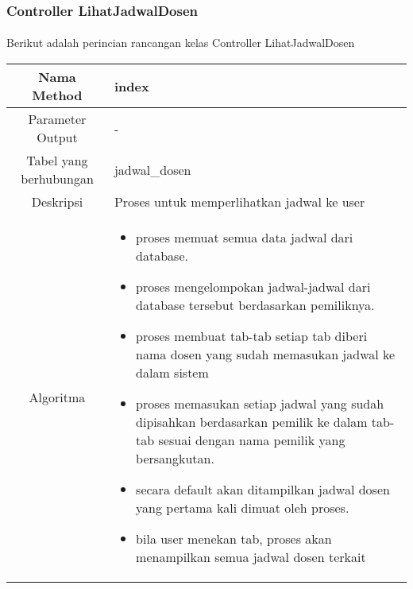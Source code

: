 \subsubsection{Controller LihatJadwalDosen}
\paragraph{} Berikut adalah perincian rancangan kelas Controller LihatJadwalDosen \\
\begin{tabular}{|c|p{11cm}|}
\hline
Nama Method 	& 	index 	\\
\hline
Parameter Output & - \\
\hline
Tabel yang berhubungan & jadwal\_dosen \\
\hline
Deskripsi	& Proses untuk memperlihatkan jadwal ke user \\
\hline
Algoritma	& \begin{itemize}
				\item proses memuat semua data jadwal dari database.
				\item proses mengelompokan jadwal-jadwal dari database tersebut berdasarkan pemiliknya.
				\item proses membuat tab-tab setiap tab diberi nama dosen yang sudah memasukan jadwal ke dalam sistem
				\item proses memasukan setiap jadwal yang sudah dipisahkan berdasarkan pemilik ke dalam tab-tab sesuai dengan nama pemilik yang bersangkutan.
				\item secara default akan ditampilkan jadwal dosen yang pertama kali dimuat oleh proses.
				\item bila user menekan tab, proses akan menampilkan semua jadwal dosen terkait
				\end{itemize} \\
\hline
\end{tabular}
\\

